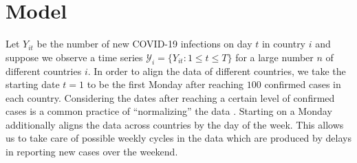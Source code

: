\documentclass[a4paper,12pt]{article}
\numberwithin{equation}{section}
\begin{document}








\renewcommand{\baselinestretch}{1.3}\normalsize



\section{Model}


Let $Y_{it}$ be the number of new COVID-19 infections on day $t$ in country $i$ and suppose we observe a time series $\mathcal{Y}_i = \{ Y_{it}: 1 \le t \le T \}$ for a large number $n$ of different countries $i$. In order to align the data of different countries, we take the starting date $t=1$ to be the first Monday after reaching $100$ confirmed cases in each country. Considering the dates after reaching a certain level of confirmed cases is a common practice of ``normalizing'' the data \citep[see e.g.][]{Cohen2020}. Starting on a Monday additionally aligns the data across countries by the day of the week. This allows us to take care of possible weekly cycles in the data which are produced by delays in reporting new cases over the weekend. 
\end{document}
